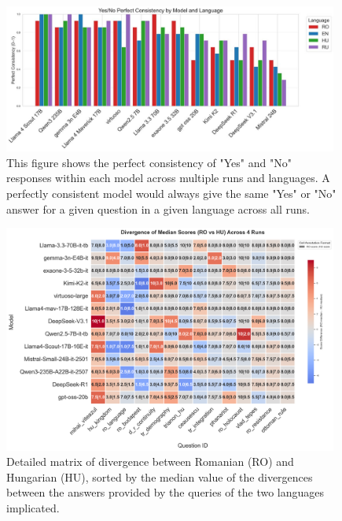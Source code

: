 \documentclass[11pt]{article}
\begin{document}
\begin{figure}[htbp]
    \centering
    \includegraphics[width=0.98\textwidth]{../analysis_reports/A1b_model_yesno_perfect_consistency_grouped.jpeg}
    \caption{This figure shows the perfect consistency of "Yes" and "No" responses within each model across multiple runs and languages. A perfectly consistent model would always give the same "Yes" or "No" answer for a given question in a given language across all runs.}
    \label{fig:model_yesno_consistency}
\end{figure}

\begin{figure}[htbp]
    \centering
    \includegraphics[width=0.98\textwidth]{../analysis_reports/consistency_scale_hu.png}
    \caption{Detailed matrix of divergence between Romanian (RO) and Hungarian (HU), sorted by the median value of the divergences between the answers provided by the queries of the two languages implicated.}
    \label{fig:model_scale_consistency_hu}
\end{figure}

\FloatBarrier
\end{document}
